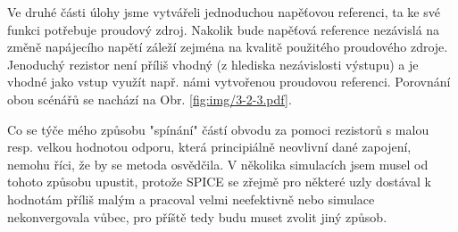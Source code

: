 \documentclass{protokol}
\begin{document}
  Ve druhé části úlohy jsme vytvářeli jednoduchou napěťovou referenci, ta ke své funkci potřebuje proudový zdroj. Nakolik bude napěťová reference nezávislá na změně napájecího napětí záleží zejména na kvalitě použitého proudového zdroje. Jenoduchý rezistor není příliš vhodný (z hlediska nezávislosti výstupu) a je vhodné jako vstup využít např. námi vytvořenou proudovou referenci. Porovnání obou scénářů se nachází na Obr. \ref{fig:img/3-2-3.pdf}. 

  Co se týče mého způsobu "spínání" částí obvodu za pomoci rezistorů s malou resp. velkou hodnotou odporu, která principiálně neovlivní dané zapojení, nemohu říci, že by se metoda osvědčila. V několika simulacích jsem musel od tohoto způsobu upustit, protože SPICE se zřejmě pro některé uzly dostával k hodnotám příliš malým a pracoval velmi neefektivně nebo simulace nekonvergovala vůbec, pro příště tedy budu muset zvolit jiný způsob.  

\end{document}
